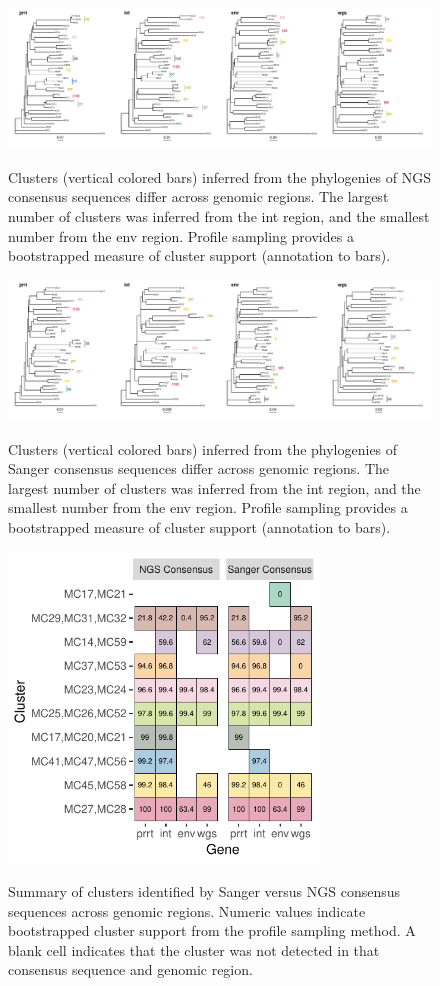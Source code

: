 \documentclass[letterpaper]{article}
\begin{document}
\begin{figure}[p!]
	\caption{Clusters (vertical colored bars) inferred from the phylogenies of NGS consensus sequences differ across genomic regions. The largest number of clusters was inferred from the int region, and the smallest number from the env region. Profile sampling provides a bootstrapped measure of cluster support (annotation to bars).}
	\centering
	\includegraphics[width=\linewidth]{Figure4}
	\label{fig4}
\end{figure}

\begin{figure}[p!]
	\caption{Clusters (vertical colored bars) inferred from the phylogenies of Sanger consensus sequences differ across genomic regions. The largest number of clusters was inferred from the int region, and the smallest number from the env region. Profile sampling provides a bootstrapped measure of cluster support (annotation to bars).}
	\centering
	\includegraphics[width=\linewidth]{Figure5}
	\label{fig5}
\end{figure}

\newpage

\begin{figure}[p!]
	\caption{Summary of clusters identified by Sanger versus NGS consensus sequences across genomic regions. Numeric values indicate bootstrapped cluster support from the profile sampling method. A blank cell indicates that the cluster was not detected in that consensus sequence and genomic region.}
	\centering
	\includegraphics[width=3.25in]{Figure6}
	\label{fig6}
\end{figure}
\end{document}

